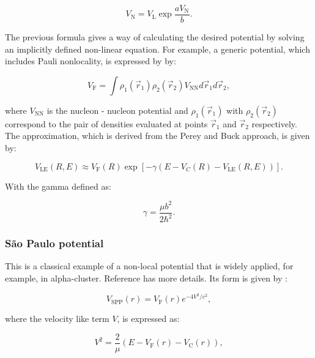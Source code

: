 \documentclass[openany]{book}
\begin{document}
\begin{equation}\label{eq:nonLocality_connection}
	V_{\mathrm{N}} = V_{\mathrm{L}} \exp{\frac{a V_{\mathrm{N}}}{b}}.
\end{equation}

The previous formula gives a way of calculating the desired potential by solving an implicitly defined non-linear equation. For example, a generic potential, which includes Pauli nonlocality, is expressed by \cite{golf_hellmers_weber_2009} by:

\begin{equation}\label{potential_nonLocal_folding}
	V_{\mathrm{F}} = \int \rho_1(\vec r_1) \rho_2(\vec r_2) V_\mathrm{NN} d\vec r_1 d\vec r_2,
\end{equation}

where $V_\mathrm{NN}$ is the nucleon - nucleon potential and $\rho_1(\vec r_1)$ with  $\rho_2(\vec r_2)$ correspond to the pair of densities evaluated at points $\vec r_1$ and $\vec r_2$ respectively. The approximation, which is derived from the Perey and Buck approach, is given by: 

\begin{equation}\label{potential_nonLocal_LE}
	V_\mathrm{LE}(R, E) \approx V_\mathrm{F}(R) \exp [{-\gamma (E - V_C(R) -V_\mathrm{LE}(R, E))}].
\end{equation}

With the gamma defined as:

\begin{equation}\label{potential_nonLocal_b}
	\gamma = \frac{\mu b^2}{2\hbar^2}.
\end{equation}


\subsubsection{São Paulo potential}

This is a classical example of a non-local potential that is widely applied, for example, in alpha-cluster. Reference \cite{bai_ren_2018} has more details. Its form is given by \cite{chamon_2007}:

\begin{equation} \label{eq:potential_SaoPaulo}
	V_{\mathrm{SPP}} (r) = V_{\mathrm{F}} (r)e^{-4V^2/c^2},
\end{equation}

where the velocity like term $V$, is expressed as: 

\begin{equation} \label{eq:potential_SaoPaulo_speed}
	V^2 = \frac{2}{\mu} \left( E - V_{\mathrm{F}}(r) - V_{\mathrm{C}}(r) \right),
\end{equation}
\end{document}
